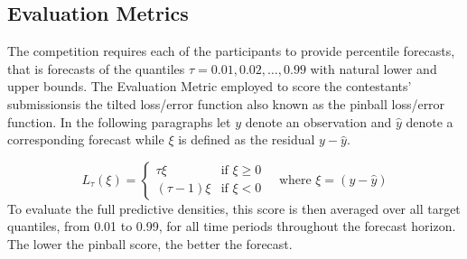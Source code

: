 \documentclass[conference]{IEEEtran}
\begin{document}
\subsection{Evaluation Metrics}
The competition requires each of the participants to provide percentile forecasts, that is forecasts of the quantiles $\tau=0.01, 0.02, \dots, 0.99$ with natural lower and upper bounds.
The Evaluation Metric employed to score the contestants' submissionsis the tilted loss/error function also known as the pinball loss/error function. In the following paragraphs let $y$ denote an observation and $\hat{y}$ denote a corresponding forecast while $\xi$ is defined as the residual $y-\hat{y}$.\par
\[
  L_{\tau}(\xi)=\begin{cases} \tau \xi & \text{if } \xi \geq 0 \\
                                          (\tau-1)\xi & \text{if } \xi < 0 
                                  \end{cases} \quad\text{where } \xi=(y-\hat{y})
\]
To evaluate the full predictive densities, this score is then averaged over all target quantiles, from 0.01 to 0.99, for all time periods throughout the forecast horizon. The lower the pinball score, the better the forecast.
\end{document}
